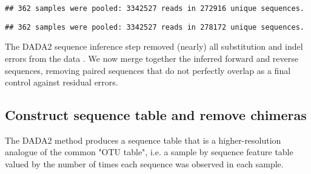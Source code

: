 \begin{knitrout}
\color{fgcolor}\begin{kframe}
\begin{alltt}
 \hlkwb{<-}  \hlstd{=ddF[[}\hlstd{]]}\hlopt{$} \hlstd{=}\hlstd{)}
\end{alltt}
\begin{verbatim}
## 362 samples were pooled: 3342527 reads in 272916 unique sequences.
\end{verbatim}
\begin{alltt}
 \hlkwb{<-}  \hlstd{=ddR[[}\hlstd{]]}\hlopt{$} \hlstd{=}\hlstd{)}
\end{alltt}
\begin{verbatim}
## 362 samples were pooled: 3342527 reads in 278172 unique sequences.
\end{verbatim}
\end{kframe}
\end{knitrout}

The DADA2 sequence inference step removed (nearly) all substitution and
indel errors from the data \cite{dada2}. We now merge together the inferred forward 
and reverse sequences, removing paired sequences that do not perfectly
overlap as a final control against residual errors.

\begin{knitrout}
\color{fgcolor}\begin{kframe}
\begin{alltt}
 \hlkwb{<-} 
\end{alltt}
\end{kframe}
\end{knitrout}

\subsection*{Construct sequence table and remove chimeras}

The DADA2 method produces a sequence table that is a higher-resolution
analogue of the common "OTU table", i.e. a sample by sequence feature
table valued by the number of times each sequence was observed in each sample.

